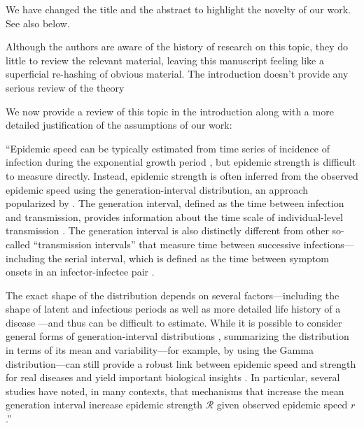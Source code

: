 \documentclass[12pt]{article}
\newcommand{\RR}{\ensuremath{{\mathcal R}}\xspace}
\newcommand{\revtext}{\textsf}
\begin{document}
We have changed the title and the abstract to highlight the novelty of our work. 
See also below.

\revtext{Although the authors are aware of the history of research on this topic, they do little to review the relevant material, leaving this manuscript feeling like a superficial re-hashing of obvious material.  The introduction doesn't provide any serious review of the theory}

We now provide a review of this topic in the introduction along with a more detailed justification of the assumptions of our work:

``Epidemic speed can be typically estimated from time series of incidence of infection during the exponential growth period \citep{mills2004transmissibility,nishiura2009transmission,ma2014estimating}, but epidemic strength is difficult to measure directly.
Instead, epidemic strength is often inferred from the observed epidemic speed using the generation-interval distribution, an approach popularized by \citep{wallinga2007generation}.
The generation interval, defined as the time between infection and transmission, provides information about the time scale of individual-level transmission \citep{svensson2007note}.
The generation interval is also distinctly different from other so-called ``transmission intervals'' that measure time between successive infections---including the serial interval, which is defined as the time between symptom onsets in an infector-infectee pair \citep{fine2003interval,grassly2008mathematical,britton2019estimation,ali2020serial,park2021forward}.

The exact shape of the distribution depends on several factors---including the shape of latent and infectious periods \citep{lloyd2001realistic,wearing2005appropriate,roberts2007model} as well as more detailed life history of a disease \citep{huber2016quantitative}---and thus can be difficult to estimate.
While it is possible to consider general forms of generation-interval distributions \citep{miller2010epidemics,svensson2015influence}, summarizing the distribution in terms of its mean and variability---for example, by using the Gamma distribution---can still provide a robust link between epidemic speed and strength for real diseases and yield important biological insights \citep{park2019practical}.
In particular, several studies have noted, in many contexts, that mechanisms that increase the mean generation interval increase epidemic strength $\RR$ given observed epidemic speed $r$ \citep{eaton2014proportion,powers2014impact,weitz2015modeling,park2020time}.''
\end{document}
